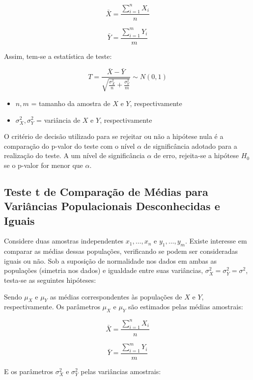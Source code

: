 \documentclass[
]{estat/estat}
\providecommand{\tightlist}{%
  \setlength{\itemsep}{0pt}\setlength{\parskip}{0pt}}\usepackage{longtable,booktabs,array}
\begin{document}
\[
\bar{X} = \frac{\sum_{i=1}^{n} X_i}{n}
\]

\[
\bar{Y} = \frac{\sum_{i=1}^{m} Y_i}{m}
\]

Assim, tem-se a estatística de teste:

\[
T = \frac{\bar{X} - \bar{Y}}{\sqrt{\frac{\sigma^2_{X}}{n} + \frac{\sigma^2_{Y}}{m}}} \sim N(0,1)
\]

\begin{itemize}
\tightlist
\item
  \(n, m\) = tamanho da amostra de \(X\) e \(Y\), respectivamente
\item
  \(\sigma_X^2, \sigma_Y^2\) = variância de \(X\) e \(Y\),
  respectivamente
\end{itemize}

O critério de decisão utilizado para se rejeitar ou não a hipótese nula
é a comparação do p-valor do teste com o nível \(\alpha\) de
significância adotado para a realização do teste. A um nível de
significância \(\alpha\) de erro, rejeita-se a hipótese \(H_{0}\) se o
p-valor for menor que \(\alpha\).

\hypertarget{teste-t-de-comparauxe7uxe3o-de-muxe9dias-para-variuxe2ncias-populacionais-desconhecidas-e-iguais}{%
\subsection{Teste t de Comparação de Médias para Variâncias
Populacionais Desconhecidas e
Iguais}\label{teste-t-de-comparauxe7uxe3o-de-muxe9dias-para-variuxe2ncias-populacionais-desconhecidas-e-iguais}}

Considere duas amostras independentes \(x_1, \ldots, x_n\) e
\(y_1, \ldots, y_m\). Existe interesse em comparar as médias dessas
populações, verificando se podem ser consideradas iguais ou não. Sob a
suposição de normalidade nos dados em ambas as populações (simetria nos
dados) e igualdade entre suas variâncias,
\(\sigma_X^2 = \sigma_Y^2 = \sigma^2\), testa-se as seguintes hipóteses:


Sendo \(\mu_X\) e \(\mu_Y\) as médias correspondentes às populações de
\(X\) e \(Y\), respectivamente. Os parâmetros \(\mu_X\) e \(\mu_Y\) são
estimados pelas médias amostrais:

\[
\bar{X} = \frac{\sum_{i=1}^{n} X_i}{n}
\]

\[
\bar{Y} = \frac{\sum_{i=1}^{m} Y_i}{m}
\]

E os parâmetros \(\sigma_X^2\) e \(\sigma_Y^2\) pelas variâncias
amostrais:
\end{document}
